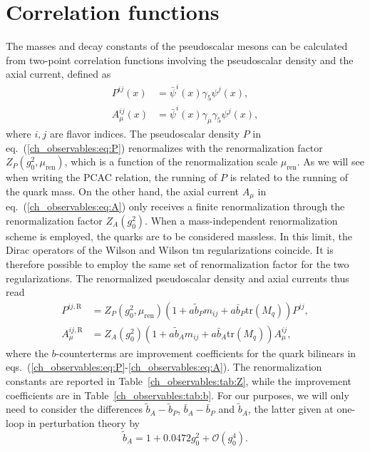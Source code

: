 \section{Correlation functions}
\label{ch_observables:sec:correlators}

The masses and decay constants of the pseudoscalar mesons can be calculated from two-point correlation functions involving the pseudoscalar density and the axial current, defined as 
\begin{align}
\label{ch_observables:eq:P}
P^{ij}(x)&=\bar{\psi}^{i}(x)\gamma_5\psi^{j}(x),\\
\label{ch_observables:eq:A}
A_{\mu}^{ij}(x)&=\bar{\psi}^i(x)\gamma_{\mu}\gamma_5\psi^{j}(x),
\end{align}
where $i,j$ are flavor indices. The pseudoscalar density $P$ in eq.~(\ref{ch_observables:eq:P}) renormalizes with the renormalization factor $Z_P(g_0^2,\mu_{\textrm{ren}})$, which is a function of the renormalization scale $\mu_{\textrm{ren}}$. As we will see when writing the PCAC relation, the running of $P$ is related to the running of the quark mass.  On the other hand, the axial current $A_{\mu}$ in eq.~(\ref{ch_observables:eq:A}) only receives a finite renormalization through the renormalization factor $Z_A(g_0^2)$. When  a mass-independent renormalization scheme is employed, the quarks are to be considered massless. In this limit, the Dirac operators of the Wilson and  Wilson tm regularizations coincide. It is therefore possible to employ the same set of renormalization factor for the two regularizations. The renormalized pseudoscalar density and axial currents thus read
\begin{align}
\label{ch_observables:eq:corr_ren}
P^{ij,{\textrm{R}}}&=Z_P(g_0^2,\mu_{\textrm{ren}})\left(1+a\tilde{b}_Pm_{ij}+a\bar{b}_P{\textrm{tr}}\left(M_q\right)\right)P^{ij}, \\
A_{\mu}^{ij,{\textrm{R}}}&=Z_A(g_0^2)\left(1+a\tilde{b}_Am_{ij}+a\bar{b}_A{\textrm{tr}}\left(M_q\right)\right)A_{\mu}^{ij},
\end{align}
where the $b$-counterterms are improvement coefficients for the quark bilinears in eqs.~(\ref{ch_observables:eq:P}-\ref{ch_observables:eq:A}). The renormalization constants are reported in Table~\ref{ch_observables:tab:Z}, while the improvement coefficients are in Table~\ref{ch_observables:tab:b}. For our purposes, we will only need to consider the differences $\tilde{b}_A-\tilde{b}_P$, $\bar{b}_A-\bar{b}_P$ and $\tilde{b}_A$, the latter given at one-loop in perturbation theory by~\citep{Taniguchi:1998pf}
\begin{equation}
\label{ch_observables:eq:bA}
\tilde{b}_A=1+0.0472g_0^2+\mathcal{O}(g_0^4).
\end{equation}

